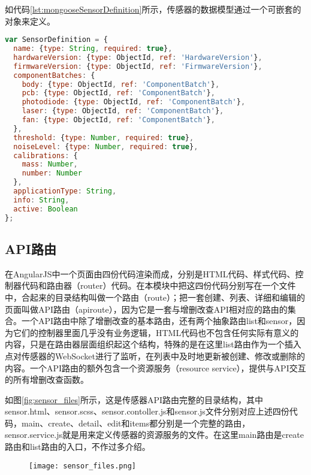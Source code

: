 如代码\ref{lst:mongooseSensorDefinition}所示，传感器的数据模型通过一个可嵌套的对象来定义。
\begin{lstlisting}[language={JavaScript}, label={lst:mongooseSensorDefinition}, caption={传感器的Mongoose数据模型}]
var SensorDefinition = {
  name: {type: String, required: true},
  hardwareVersion: {type: ObjectId, ref: 'HardwareVersion'},
  firmwareVersion: {type: ObjectId, ref: 'FirmwareVersion'},
  componentBatches: {
    body: {type: ObjectId, ref: 'ComponentBatch'},
    pcb: {type: ObjectId, ref: 'ComponentBatch'},
    photodiode: {type: ObjectId, ref: 'ComponentBatch'},
    laser: {type: ObjectId, ref: 'ComponentBatch'},
    fan: {type: ObjectId, ref: 'ComponentBatch'},
  },
  threshold: {type: Number, required: true},
  noiseLevel: {type: Number, required: true},
  calibrations: {
    mass: Number,
    number: Number
  },
  applicationType: String,
  info: String,
  active: Boolean
};
\end{lstlisting}
\subsection{API路由}
在AngularJS中一个页面由四份代码渲染而成，分别是HTML代码、样式代码、控制器代码和路由器（router）代码。在本模块中把这四份代码分别写在一个文件中，合起来的目录结构叫做一个路由（route）；把一套创建、列表、详细和编辑的页面叫做API路由（apiroute），因为它是一套与增删改查API相对应的路由的集合。一个API路由中除了增删改查的基本路由，还有两个抽象路由list和sensor，因为它们的控制器里面几乎没有业务逻辑，HTML代码也不包含任何实际有意义的内容，只是在路由器层面组织起这个结构，特殊的是在这里list路由作为一个插入点对传感器的WebSocket进行了监听，在列表中及时地更新被创建、修改或删除的内容。一个API路由的额外包含一个资源服务（resource service），提供与API交互的所有增删改查函数。

如图\ref{fig:sensor_files}所示，这是传感器API路由完整的目录结构，其中sensor.html、sensor.scss、sensor.contoller.js和sensor.js文件分别对应上述四份代码，main、create、detail、edit和items都分别是一个完整的路由，sensor.service.js就是用来定义传感器的资源服务的文件。在这里main路由是create路由和list路由的入口，不作过多介绍。
\begin{figure}[H]
 \centering
 \texttt{[image: sensor\_files.png]}
\end{figure}

